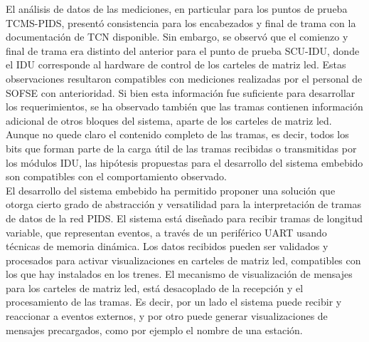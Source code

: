 El análisis de datos de las mediciones, en particular para los puntos de prueba TCMS-PIDS, presentó consistencia para los encabezados y final de trama con la documentación de TCN disponible. Sin embargo, se observó que el comienzo y final de trama era distinto del anterior para el punto de prueba SCU-IDU, donde el IDU corresponde al hardware de control de los carteles de matriz led. Estas observaciones resultaron compatibles con mediciones realizadas por el personal de SOFSE con anterioridad. Si bien esta información fue suficiente para desarrollar los requerimientos, se ha observado también que las tramas contienen información adicional de otros bloques del sistema, aparte de los carteles de matriz led. Aunque no quede claro el contenido completo de las tramas, es decir, todos los bits que forman parte de la carga útil de las tramas recibidas o transmitidas por los módulos IDU, las hipótesis propuestas para el desarrollo del sistema embebido son compatibles con el comportamiento observado.\\


El desarrollo del sistema embebido ha permitido proponer una solución que otorga cierto grado de abstracción y versatilidad para la interpretación de tramas de datos de la red PIDS. El sistema está diseñado para recibir tramas de longitud variable, que representan eventos, a través de un periférico UART usando técnicas de memoria dinámica. Los datos recibidos pueden ser validados y procesados para activar visualizaciones en carteles de matriz led, compatibles con los que hay instalados en los trenes. El mecanismo de visualización de mensajes para los carteles de matriz led, está desacoplado de la recepción y el procesamiento de las tramas. Es decir, por un lado el sistema puede recibir y reaccionar a eventos externos, y por otro puede generar visualizaciones de mensajes precargados, como por ejemplo el nombre de una estación.\\

